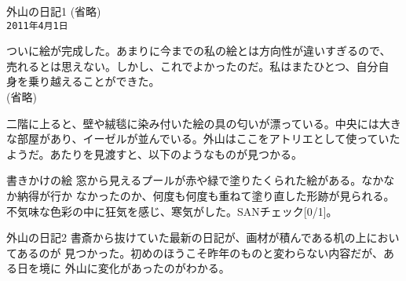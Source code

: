 \documentclass[a4paper,8pt,min]{jsarticle}
\begin{document}
\begin{itembox}{外山の日記1}
 (省略)\\

 \tt{2011年4月1日}

 ついに絵が完成した。あまりに今までの私の絵とは方向性が違いすぎるので、
 売れるとは思えない。しかし、これでよかったのだ。私はまたひとつ、自分自
 身を乗り越えることができた。\\

 (省略)\\
\end{itembox}

二階に上ると、壁や絨毯に染み付いた絵の具の匂いが漂っている。中央には大き
な部屋があり、イーゼルが並んでいる。外山はここをアトリエとして使っていた
ようだ。あたりを見渡すと、以下のようなものが見つかる。

\begin{topic}
 \item[書きかけの絵]
 窓から見えるプールが赤や緑で塗りたくられた絵がある。なかなか納得が行か
 なかったのか、何度も何度も重ねて塗り直した形跡が見られる。
 不気味な色彩の中に狂気を感じ、寒気がした。SANチェック[0/1]。

 \item[外山の日記2]
 書斎から抜けていた最新の日記が、画材が積んである机の上においてあるのが
 見つかった。初めのほうこそ昨年のものと変わらない内容だが、ある日を境に
 外山に変化があったのがわかる。
\end{topic}
\end{document}

